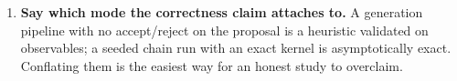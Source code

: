 \begin{enumerate}
    imposition makes the final histogram correct by construction; the
    informative numbers are the raw charge-match rate (0.21) and the raw
    $\langle Q^2 \rangle$ excess, which \emph{grows with volume} (1.7--2.7 at
    $L \le 32$ to 7.1--28.2 at $L = 64/128$). Be explicit about which
    mechanism supplies the difference and whether it exists in the target
    theory.
  \item \textbf{Say which mode the correctness claim attaches to.} A
    generation pipeline with no accept/reject on the proposal is a heuristic
    validated on observables; a seeded chain run with an exact kernel is
    asymptotically exact. Conflating them is the easiest way for an honest
    study to overclaim.
\end{enumerate}

